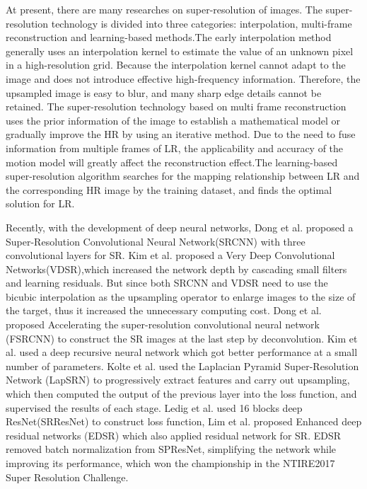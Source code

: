 \documentclass[runningheads,a4paper]{llncs}
\begin{document}
At present, there are many researches on super-resolution of images. The super-resolution technology is divided into three categories: interpolation, multi-frame reconstruction and learning-based methods.The early interpolation method \cite{1163154} generally uses an interpolation kernel to estimate the value of an unknown pixel in a high-resolution grid. Because the interpolation kernel cannot adapt to the image and does not introduce effective high-frequency information. Therefore, the upsampled image is easy to blur, and many sharp edge details cannot be retained. The super-resolution technology based on multi frame reconstruction\cite{872908,IRANI1991231,56062,Patti1997Superresolution,503915} uses the prior information of the image to establish a mathematical model or gradually improve the HR by using an iterative method. Due to the need to fuse information from multiple frames of LR, the applicability and accuracy of the motion model will greatly affect the reconstruction effect.The learning-based super-resolution  algorithm\cite{Shu2013Example,Yang2008Image} searches for the mapping relationship between LR and the corresponding HR image by the training dataset, and finds the optimal solution for LR.

Recently, with the development of deep neural networks, Dong et al. \cite{Dong2014Learning} proposed a Super-Resolution Convolutional Neural Network(SRCNN) with three convolutional layers for SR. Kim et al. \cite{Kim2015Accurate} proposed a Very Deep Convolutional Networks(VDSR),which increased the network depth by cascading small filters and learning residuals. But since both SRCNN \cite{Dong2014Learning} and VDSR \cite{Kim2015Accurate} need to use the bicubic interpolation as the upsampling operator to enlarge images to the size of the target, thus it increased the unnecessary computing cost. Dong et al. \cite{Dong2016Accelerating} proposed Accelerating the super-resolution convolutional
neural network (FSRCNN) to construct the SR images at the last step by  deconvolution. Kim et al. \cite{Kim2015Deeply} used a deep recursive neural network which got better performance at a small number of parameters. Kolte et al. \cite{Lai2017Deep} used the Laplacian Pyramid
Super-Resolution Network (LapSRN) to progressively  extract features and carry out upsampling, which then computed the output of the previous layer into the loss function, and supervised the results of each stage. Ledig et al.\cite{Ledig2016Photo} used 16 blocks deep ResNet(SRResNet) to construct loss function, Lim et al.\cite{Lim2017Enhanced} proposed Enhanced deep residual networks (EDSR) which also applied residual network for SR. EDSR\cite{Lim2017Enhanced} removed  batch normalization  from SPResNet\cite{Ledig2016Photo}, simplifying the network while improving its performance, which won the championship in the NTIRE2017 Super Resolution Challenge.
\end{document}
